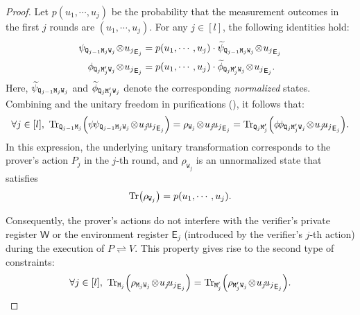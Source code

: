 \documentclass[10pt,a4paper]{article}
\numberwithin{equation}{section}
\numberwithin{figure}{section}
\newcommand{\protocol}[2]{{#1}\!\rightleftharpoons\!{#2}}
\DeclarePairedDelimiter\rbra{\lparen}{\rparen}
\let\ket\relax\DeclarePairedDelimiter\ket{\lvert}{\rangle}
\let\bra\relax\DeclarePairedDelimiter\bra{\langle}{\rvert}
\newcommand{\ketbra}[2]{\ensuremath{\ket{#1}\!\bra{#2}}}
\newcommand{\Tr}{\mathrm{Tr}}
\newcommand{\sfE}{\mathsf{E}}
\newcommand{\sfW}{\mathsf{W}}
\newcommand{\ttM}{\mathtt{M}}
\newcommand{\ttQ}{\mathtt{Q}}
\newcommand{\ttW}{\mathtt{W}}
\begin{document}
\begin{proof}
    Let $p(u_1,\cdots,u_j)$ be the probability that the measurement outcomes in the first $j$ rounds are $(u_1,\cdots,u_j)$. For any $j \in [l]$, the following identities hold: 
    \begin{equation}
    \label{eq:branch-normalization-factor}
    \begin{aligned}
        \ket{\psi}_{\ttQ_{j-1}\ttM_j\ttW_j} \!\otimes\! \ket{u_j}_{\sfE_j} &= p(u_1,\cdots,u_j) \cdot \ket{\widetilde{\psi}}_{\ttQ_{j-1}\ttM_j\ttW_j} \!\otimes\! \ket{u_j}_{\sfE_j}\\
        \ket{\phi}_{\ttQ_{j}\ttM'_j\ttW_j} \!\otimes\! \ket{u_j}_{\sfE_j} &= p(u_1,\cdots,u_j) \cdot \ket{\widetilde{\phi}}_{\ttQ_{j}\ttM'_j\ttW_j} \!\otimes\! \ket{u_j}_{\sfE_j}. 
    \end{aligned}
    \end{equation}
    Here, $\ket{\widetilde{\psi}}_{\ttQ_{j-1}\ttM_j\ttW_j}$ and $\ket{\widetilde{\phi}}_{\ttQ_{j}\ttM'_j\ttW_j}$ denote the corresponding \textit{normalized} states.     
    Combining  and
    the unitary freedom in purifications (), it follows that:
    \begin{equation*}
        \forall j \in [l],~\Tr_{\ttQ_{j-1}\ttM_j}\rbra*{\ketbra{\psi}{\psi}_{\ttQ_{j-1}\ttM_j\ttW_j} \!\otimes\! \ketbra{u_j}{u_j}_{\sfE_j}} = \rho_{\ttW_j} \!\otimes\! \ketbra{u_j}{u_j}_{\sfE_j}  = \Tr_{\ttQ_{j}\ttM'_j}\rbra*{\ketbra{\phi}{\phi}_{\ttQ_{j}\ttM'_j\ttW_j} \!\otimes\! \ketbra{u_j}{u_j}_{\sfE_j}}.
    \end{equation*}
    In this expression, the underlying unitary transformation corresponds to the prover's action $P_j$ in the $j$-th round, and $\rho_{\ttW_j}$ is an unnormalized state that satisfies 
    \begin{equation}
        \label{eq:branch-prob}
        \Tr\rbra[\big]{\rho_{\ttW_j}} = p(u_1,\cdots,u_j).
    \end{equation}
    
    Consequently, the prover's actions do not interfere with the verifier's private register $\sfW$ or the environment register $\sfE_j$ (introduced by the verifier's $j$-th action) during the execution of $\protocol{P}{V}$. This property gives rise to the second type of constraints: 
    \begin{equation}
        \label{eq:QIPL-prover-actions-cond}
        \forall j \in [l],~\Tr_{\ttM_j}\rbra*{\rho_{\ttM_j\ttW_j} \!\otimes\! \ketbra{u_j}{u_j}_{\sfE_j}} = \Tr_{\ttM'_j}\rbra*{\rho_{\ttM'_j\ttW_j} \!\otimes\! \ketbra{u_j}{u_j}_{\sfE_j}}.
    \end{equation}


\end{proof}
\end{document}
